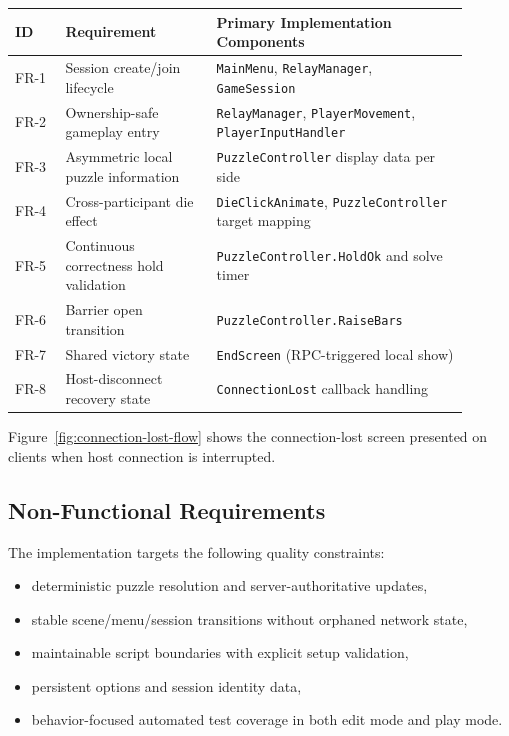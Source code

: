 \begin{table}[H]
\centering
\caption{Functional Requirement to Implementation Mapping}
\label{tab:functional-mapping}
\begin{longtable}{|>{\centering\arraybackslash}m{0.1\linewidth}|>{\centering\arraybackslash}m{0.3\linewidth}|>{\centering\arraybackslash}m{0.5\linewidth}|}
\hline
\hline
\textbf{ID} & \textbf{Requirement} & \textbf{Primary Implementation Components} \\
\hline
FR-1 & Session create/join lifecycle & \texttt{MainMenu}, \texttt{RelayManager}, \texttt{GameSession} \\
\hline
FR-2 & Ownership-safe gameplay entry & \texttt{RelayManager}, \texttt{PlayerMovement}, \texttt{PlayerInputHandler} \\
\hline
FR-3 & Asymmetric local puzzle information & \texttt{PuzzleController} display data per side \\
\hline
FR-4 & Cross-participant die effect & \texttt{DieClickAnimate}, \texttt{PuzzleController} target mapping \\
\hline
FR-5 & Continuous correctness hold validation & \texttt{PuzzleController.HoldOk} and solve timer \\
\hline
FR-6 & Barrier open transition & \texttt{PuzzleController.RaiseBars} \\
\hline
FR-7 & Shared victory state & \texttt{EndScreen} (RPC-triggered local show) \\
\hline
FR-8 & Host-disconnect recovery state & \texttt{ConnectionLost} callback handling \\
\hline
\end{longtable}
\addtocounter{table}{-1}
\end{table}

Figure~\ref{fig:connection-lost-flow} shows the connection-lost screen presented on clients when host connection is interrupted.

\subsection*{Non-Functional Requirements}
The implementation targets the following quality constraints:
\begin{itemize}
\item deterministic puzzle resolution and server-authoritative updates,
\item stable scene/menu/session transitions without orphaned network state,
\item maintainable script boundaries with explicit setup validation,
\item persistent options and session identity data,
\item behavior-focused automated test coverage in both edit mode and play mode.
\end{itemize}

